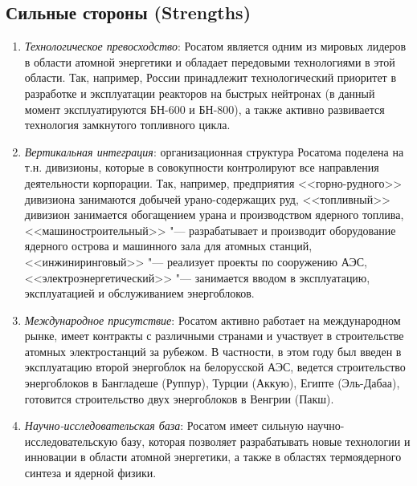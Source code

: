 \subsection{Сильные стороны (Strengths)}
\begin{enumerate}
\item \emph{Технологическое превосходство}: Росатом является одним из мировых лидеров в области атомной энергетики и обладает передовыми технологиями в этой области. Так, например, России принадлежит технологический приоритет в разработке и эксплуатации реакторов на быстрых нейтронах (в данный момент эксплуатируются БН-600 и БН-800), а также активно развивается технология замкнутого топливного цикла.

\item \emph{Вертикальная интеграция}: организационная структура Росатома поделена на т.н. дивизионы, которые в совокупности контролируют все направления деятельности корпорации. Так, например, предприятия <<горно-рудного>> дивизиона занимаются добычей урано-содержащих руд, <<топливный>> дивизион занимается обогащением урана и производством ядерного топлива, <<машиностроительный>> "--- разрабатывает и производит оборудование ядерного острова и машинного зала для атомных станций, <<инжиниринговый>> "--- реализует проекты по сооружению АЭС, <<электроэнергетический>> "--- занимается вводом в эксплуатацию, эксплуатацией и обслуживанием энергоблоков.

\item \emph{Международное присутствие}: Росатом активно работает на международном рынке, имеет контракты с различными странами и участвует в строительстве атомных электростанций за рубежом. В частности, в этом году был введен в эксплуатацию второй энергоблок на белорусской АЭС, ведется строительство энергоблоков в Бангладеше (Руппур), Турции (Аккую), Египте (Эль-Дабаа), готовится строительство двух энергоблоков в Венгрии (Пакш).

\item \emph{Научно-исследовательская база}: Росатом имеет сильную научно-исследовательскую базу, которая позволяет разрабатывать новые технологии и инновации в области атомной энергетики, а также в областях термоядерного синтеза и ядерной физики.
\end{enumerate}
